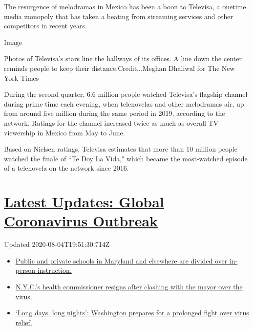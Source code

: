 The resurgence of melodramas in Mexico has been a boon to Televisa, a
onetime media monopoly that has taken a beating from streaming services
and other competitors in recent years.

Image

Photos of Televisa's stars line the hallways of its offices. A line down
the center reminds people to keep their distance.Credit...Meghan
Dhaliwal for The New York Times

During the second quarter, 6.6 million people watched Televisa's
flagship channel during prime time each evening, when telenovelas and
other melodramas air, up from around five million during the same period
in 2019, according to the network. Ratings for the channel increased
twice as much as overall TV viewership in Mexico from May to June.

Based on Nielsen ratings, Televisa estimates that more than 10 million
people watched the finale of ``Te Doy La Vida," which became the
most-watched episode of a telenovela on the network since 2016.

\hypertarget{latest-updates-global-coronavirus-outbreak}{%
\section{\texorpdfstring{\href{https://www.nytimes3xbfgragh.onion/2020/08/04/world/coronavirus-cases.html?action=click\&pgtype=Article\&state=default\&region=MAIN_CONTENT_1\&context=storylines_live_updates}{Latest
Updates: Global Coronavirus
Outbreak}}{Latest Updates: Global Coronavirus Outbreak}}\label{latest-updates-global-coronavirus-outbreak}}

Updated 2020-08-04T19:51:30.714Z

\begin{itemize}
\tightlist
\item
  \href{https://www.nytimes3xbfgragh.onion/2020/08/04/world/coronavirus-cases.html?action=click\&pgtype=Article\&state=default\&region=MAIN_CONTENT_1\&context=storylines_live_updates\#link-4825b93}{Public
  and private schools in Maryland and elsewhere are divided over
  in-person instruction.}
\item
  \href{https://www.nytimes3xbfgragh.onion/2020/08/04/world/coronavirus-cases.html?action=click\&pgtype=Article\&state=default\&region=MAIN_CONTENT_1\&context=storylines_live_updates\#link-4d1eafa8}{N.Y.C.'s
  health commissioner resigns after clashing with the mayor over the
  virus.}
\item
  \href{https://www.nytimes3xbfgragh.onion/2020/08/04/world/coronavirus-cases.html?action=click\&pgtype=Article\&state=default\&region=MAIN_CONTENT_1\&context=storylines_live_updates\#link-6b644638}{`Long
  days, long nights': Washington prepares for a prolonged fight over
  virus relief.}
\end{itemize}

